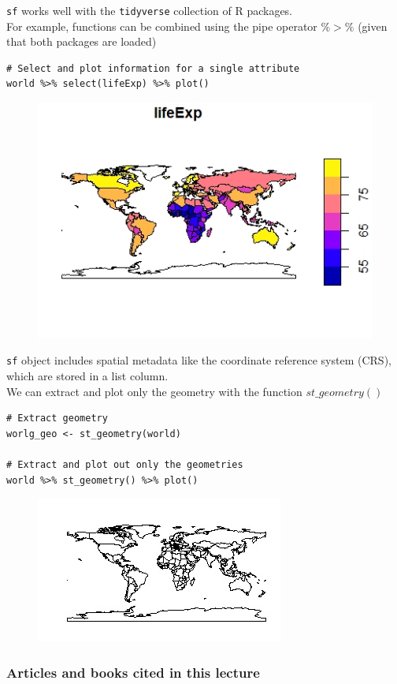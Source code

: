 \documentclass[12pt]{beamer}
\begin{document}
\begin{frame}[fragile]
\texttt{sf} works well with the \texttt{tidyverse} collection of R packages.\\
\vspace{5pt}
For example, functions can be combined using the pipe operator \scriptsize{$\%>\%$} \normalsize{(given that both packages are loaded)}
{\scriptsize
\begin{verbatim}
# Select and plot information for a single attribute
world %>% select(lifeExp) %>% plot()

\end{verbatim}
}
\begin{figure}
\includegraphics[scale=0.60]{LifeExp.jpeg}
\end{figure}
\end{frame}



\begin{frame}[fragile]
\texttt{sf} object includes spatial metadata like the coordinate reference
system (CRS), which are stored in a list column.\\
\vspace{5pt}
We can extract and plot only the geometry with the function $st\_geometry()$
{\scriptsize
\begin{verbatim}
# Extract geometry
worlg_geo <- st_geometry(world)

# Extract and plot out only the geometries
world %>% st_geometry() %>% plot()

\end{verbatim}
}
\vspace{-20pt}
\begin{figure}
\includegraphics[scale=0.75]{World_geom.jpeg}
\end{figure}
\end{frame}


\begin{frame}
\frametitle{Articles and books cited in this lecture}
\footnotesize{


}
\end{frame}
\end{document}
